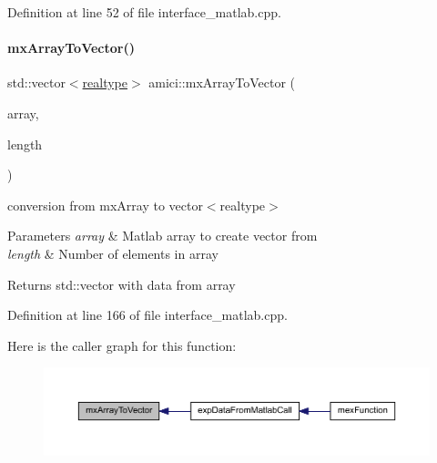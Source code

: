 Definition at line 52 of file interface\+\_\+matlab.\+cpp.

\mbox{\label{namespaceamici_af8f91dbb6a395a9907c59dd92991ec18}} 
\paragraph{\texorpdfstring{mx\+Array\+To\+Vector()}{mxArrayToVector()}}
{\footnotesize\ttfamily std\+::vector$<$\mbox{\hyperlink{namespaceamici_a1bdce28051d6a53868f7ccbf5f2c14a3}{realtype}}$>$ amici\+::mx\+Array\+To\+Vector (\begin{DoxyParamCaption}\item[{const mx\+Array $\ast$}]{array,  }\item[{int}]{length }\end{DoxyParamCaption})}

conversion from mx\+Array to vector$<$realtype$>$ 
\begin{DoxyParams}{Parameters}
{\em array} & Matlab array to create vector from \\
\hline
{\em length} & Number of elements in array \\
\hline
\end{DoxyParams}
\begin{DoxyReturn}{Returns}
std\+::vector with data from array 
\end{DoxyReturn}


Definition at line 166 of file interface\+\_\+matlab.\+cpp.

Here is the caller graph for this function\+:
\nopagebreak
\begin{figure}[H]
\begin{center}
\leavevmode
\includegraphics[width=350pt]{namespaceamici_af8f91dbb6a395a9907c59dd92991ec18_icgraph}
\end{center}
\end{figure}
\mbox{\label{namespaceamici_a00a3387dd5fe07628c21a763aee28036}} 
